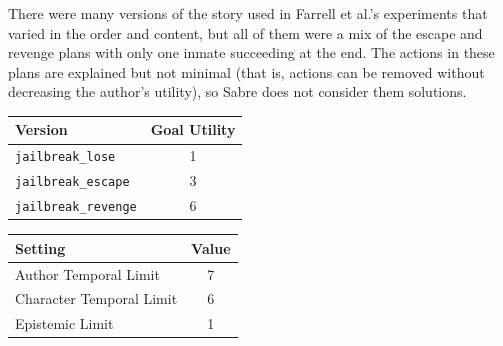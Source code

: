 \documentclass{nilreport}
\begin{document}
\medskip{}
\noindent{}

\medskip{}
\noindent{}

\medskip{}

\noindent There were many versions of the story used in Farrell et
al.'s experiments that varied in the order and content, but all of
them were a mix of the escape and revenge plans with only one inmate
succeeding at the end. The actions in these plans are explained but
not minimal (that is, actions can be removed without decreasing the
author's utility), so Sabre does not consider them solutions.

\medskip{}

\begin{center}
\begin{tabular}[t]{|l|c|}
\hline 
\textbf{Version} & \textbf{Goal Utility}\tabularnewline
\hline 
\hline 
\texttt{jailbreak\_lose} & 1\tabularnewline
\hline 
\texttt{jailbreak\_escape} & 3\tabularnewline
\hline 
\texttt{jailbreak\_revenge} & 6\tabularnewline
\hline 
\end{tabular}\textbf{\quad{}}%
\begin{tabular}[t]{|l|c|}
\hline 
\textbf{Setting} & \textbf{Value}\tabularnewline
\hline 
\hline 
Author Temporal Limit & 7\tabularnewline
\hline 
Character Temporal Limit & 6\tabularnewline
\hline 
Epistemic Limit & 1\tabularnewline
\hline 
\end{tabular}
\par\end{center}
\end{document}
